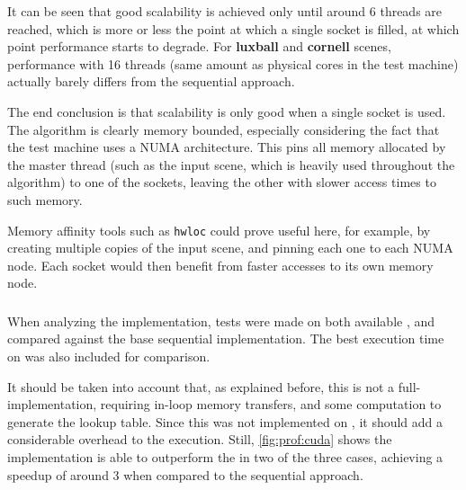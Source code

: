 \documentclass[main.tex]{subfiles}
\begin{document}
It can be seen that good scalability is achieved only until around 6 threads are reached, which is more or less the point at which a single \cpu socket is filled, at which point performance starts to degrade.
For \textbf{luxball} and \textbf{cornell} scenes, performance with 16 threads (same amount as physical \cpu cores in the test machine) actually barely differs from the sequential approach.

The end conclusion is that scalability is only good when a single socket is used. The algorithm is clearly memory bounded, especially considering the fact that the test machine uses a \acs{NUMA} architecture. This pins all memory allocated by the master thread (such as the input scene, which is heavily used throughout the algorithm) to one of the sockets, leaving the other with slower access times to such memory.

Memory affinity tools such as \texttt{hwloc} could prove useful here, for example, by creating multiple copies of the input scene, and pinning each one to each \acs{NUMA} node. Each socket would then benefit from faster accesses to its own memory node.

\subsubsection{\cuda}

When analyzing the \gpu implementation, tests were made on both available \gpus, and compared against the base sequential \cpu implementation. The best execution time on \cpu was also included for comparison.

It should be taken into account that, as explained before, this is not a full-\gpu implementation, requiring in-loop memory transfers, and some \cpu computation to generate the lookup table. Since this was not implemented on \gpu, it should add a considerable overhead to the execution. Still, \cref{fig:prof:cuda} shows the implementation is able to outperform the \cpu in two of the three cases, achieving a speedup of around 3 when compared to the sequential approach.
\end{document}
